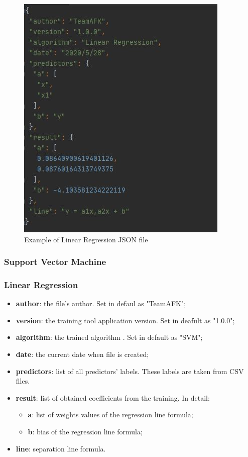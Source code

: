 		\begin{figure}[H]
		\centering
		\includegraphics[scale=0.70]{../Developer_manual/img/linear_regression_json.jpg}
		\caption{Example of Linear Regression JSON file}
	\end{figure}	
	
		\subsubsection{Support Vector Machine}
		\subsubsection{Linear Regression}
		\begin{itemize}
			\item\textbf{author}: the file's author. Set in defaul as "TeamAFK";
			\item\textbf{version}: the training tool application version. Set in deafult as "1.0.0";
			\item\textbf{algorithm}: the trained algorithm . Set in default as "SVM"; 	
			\item\textbf{date}: the current date when file is created;
			\item\textbf{predictors}: list of all predictors' labels. These labels are taken from CSV files.
			\item\textbf{result}: list of obtained coefficients from the training. In detail:
				\begin{itemize}
					\item\textbf{a}: list of weights values of the regression line formula;
					\item\textbf{b}: bias of the regression line formula;
				\end{itemize}
			\item\textbf{line}: separation line formula.
					
		\end{itemize}
		

